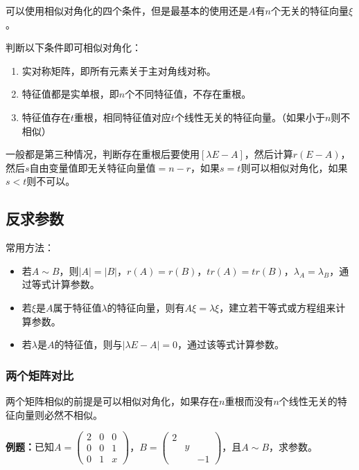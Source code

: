 可以使用相似对角化的四个条件，但是最基本的使用还是$A$有$n$个无关的特征向量$\xi$。

判断以下条件即可相似对角化：

\begin{enumerate}
    \item 实对称矩阵，即所有元素关于主对角线对称。
    \item 特征值都是实单根，即$n$个不同特征值，不存在重根。
    \item 特征值存在$t$重根，相同特征值对应$t$个线性无关的特征向量。（如果小于$n$则不相似）
\end{enumerate}

一般都是第三种情况，判断存在重根后要使用$[\lambda E-A]$，然后计算$r(E-A)$，然后$s$自由变量值即无关特征向量值$=n-r$，如果$s=t$则可以相似对角化，如果$s<t$则不可以。

\subsection{反求参数}

常用方法：

\begin{itemize}
    \item 若$A\sim B$，则$\vert A\vert=\vert B\vert$，$r(A)=r(B)$，$tr(A)=tr(B)$，$\lambda_A=\lambda_B$，通过等式计算参数。
    \item 若$\xi$是$A$属于特征值$\lambda$的特征向量，则有$A\xi=\lambda\xi$，建立若干等式或方程组来计算参数。
    \item 若$\lambda$是$A$的特征值，则与$\vert\lambda E-A\vert=0$，通过该等式计算参数。
\end{itemize}

\subsubsection{两个矩阵对比}

两个矩阵相似的前提是可以相似对角化，如果存在$n$重根而没有$n$个线性无关的特征向量则必然不相似。

\textbf{例题：}已知$A=\left(\begin{array}{ccc}
    2 & 0 & 0 \\
    0 & 0 & 1 \\
    0 & 1 & x
\end{array}\right)$，$B=\left(\begin{array}{ccc}
    2 \\
     & y \\
     & & -1
\end{array}\right)$，且$A\sim B$，求参数。\medskip

